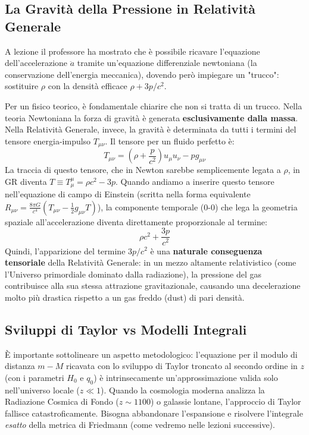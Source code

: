 \documentclass[11pt,a4paper]{report}
\begin{document}
\subsection{La Gravità della Pressione in Relatività Generale}
A lezione il professore ha mostrato che è possibile ricavare l'equazione dell'accelerazione $\ddot{a}$ tramite un'equazione differenziale newtoniana (la conservazione dell'energia meccanica), dovendo però impiegare un "trucco": sostituire $\rho$ con la densità efficace $\rho + 3p/c^2$. 

Per un fisico teorico, è fondamentale chiarire che non si tratta di un trucco. Nella teoria Newtoniana la forza di gravità è generata \textbf{esclusivamente dalla massa}. Nella Relatività Generale, invece, la gravità è determinata da tutti i termini del tensore energia-impulso $T_{\mu\nu}$.
Il tensore per un fluido perfetto è:
\begin{equation}
T_{\mu\nu} = \left(\rho + \frac{p}{c^2}\right) u_\mu u_\nu - p g_{\mu\nu}
\end{equation}
La traccia di questo tensore, che in Newton sarebbe semplicemente legata a $\rho$, in GR diventa $T \equiv T^\mu_\mu = \rho c^2 - 3p$. 
Quando andiamo a inserire questo tensore nell'equazione di campo di Einstein (scritta nella forma equivalente $R_{\mu\nu} = \frac{8\pi G}{c^4} (T_{\mu\nu} - \frac{1}{2}g_{\mu\nu}T)$), la componente temporale (0-0) che lega la geometria spaziale all'accelerazione diventa direttamente proporzionale al termine:
\begin{equation}
\rho c^2 + \frac{3p}{c^2} 
\end{equation}
Quindi, l'apparizione del termine $3p/c^2$ è una \textbf{naturale conseguenza tensoriale} della Relatività Generale: in un mezzo altamente relativistico (come l'Universo primordiale dominato dalla radiazione), la pressione del gas contribuisce alla sua stessa attrazione gravitazionale, causando una decelerazione molto più drastica rispetto a un gas freddo (dust) di pari densità.

\subsection{Sviluppi di Taylor vs Modelli Integrali}
È importante sottolineare un aspetto metodologico: l'equazione per il modulo di distanza $m-M$ ricavata con lo sviluppo di Taylor troncato al secondo ordine in $z$ (con i parametri $H_0$ e $q_0$) è intrinsecamente un'approssimazione valida solo nell'universo locale ($z \ll 1$). 
Quando la cosmologia moderna analizza la Radiazione Cosmica di Fondo ($z \sim 1100$) o galassie lontane, l'approccio di Taylor fallisce catastroficamente. Bisogna abbandonare l'espansione e risolvere l'integrale \textit{esatto} della metrica di Friedmann (come vedremo nelle lezioni successive).
\end{document}
